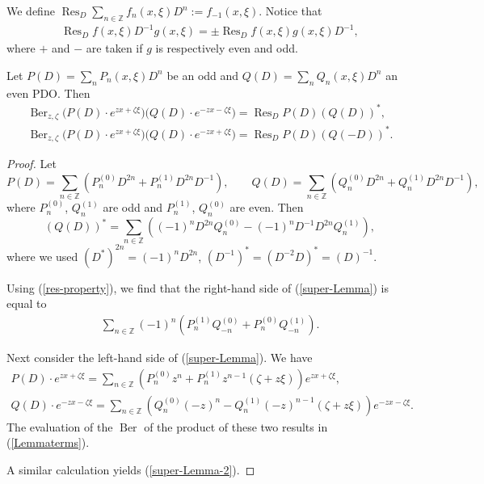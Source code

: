 \documentclass[pdftex]{sigma}
\numberwithin{equation}{section}
\newcommand{\Res}{\mathop\mathrm{Res}\nolimits}
\newcommand{\Ber}{\mathop\mathrm{Ber}\nolimits}
\newcommand{\Z}{\mathbb{Z}}
\begin{document}
We def\/ine $\Res_D\sum\limits_{n\in\Z}
f_n(x,\xi)D^n :=f_{-1}(x,\xi)$. Notice that
  \begin{gather}\label{res-property}
  \Res_D
f(x,\xi)D^{-1}g(x,\xi) =  \pm \Res_D
f(x,\xi)g(x,\xi)D^{-1} ,
 \end{gather}
 where $+$ and $-$ are taken if $g$ is
respectively even and odd.


 \begin{lemma} \label{SuperLemma} Let $P(D)=\sum_n P_n(x,\xi) D^n$ be an odd and
 $Q(D)=\sum_n Q_n(x,\xi) D^n$ an even PDO. Then
\begin{gather}\label{super-Lemma}
\Ber_{z,\zeta}  \big(P(D)\cdot e^{zx+\zeta\xi}\big)\big(Q(D)\cdot
e^{-zx-\zeta\xi}\big) = \Res_D P(D)\left(Q(D)\right)^* ,
\\
\label{super-Lemma-2}
\Ber_{z,\zeta}  \big(P(D)\cdot e^{zx+\zeta\xi}\big)\big(Q(D)\cdot
e^{-zx+\zeta\xi}\big) = \Res_D P(D)\left(Q(-D)\right)^* .
\end{gather}
 \end{lemma}

\begin{proof} Let
 \[
P(D)=\sum_{n\in\Z}\left(
P_n^{(0)}D^{2n}+P_n^{(1)}D^{2n}D^{-1}\right) ,\qquad
Q(D)=\sum_{n\in\Z}\left(
Q_n^{(0)}D^{2n}+Q_n^{(1)}D^{2n}D^{-1}\right) ,
 \]
where $P_n^{(0)}$, $Q_n^{(1)}$  are odd and $P_n^{(1)}$, $Q_n^{(0)}$ are
even. Then{\samepage
 \[
(Q(D))^* = \sum_{n\in\Z}\left(
(-1)^nD^{2n}Q_n^{(0)}-(-1)^nD^{-1}D^{2n}Q_n^{(1)}\right) ,
 \]
where we used
$
(D^*)^{2n}=(-1)^nD^{2n}$, $\left(
D^{-1}\right)^{*}=\left( D^{-2}D\right)^{*}=\left( D\right)^{-1}
$.  }

Using (\ref{res-property}), we f\/ind that the right-hand side
of (\ref{super-Lemma}) is equal to
  \begin{gather}\label{Lemmaterms}
\sum_{n\in\Z}(-1)^n\left(P_n^{(1)}Q_{-n}^{(0)}+
P_n^{(0)}Q_{-n}^{(1)} \right) .
  \end{gather}

 Next consider the left-hand side of (\ref{super-Lemma}). We have
\begin{gather*}
P(D)\cdot e^{zx+\zeta\xi} =\sum_{n\in\Z}\left(
P_n^{(0)}z^{n}+P_n^{(1)}z^{n-1}\left(\zeta+z\xi
\right)\right)e^{zx+\zeta\xi} ,
\\
Q(D)\cdot e^{-zx-\zeta\xi} =\sum_{n\in\Z}\left(
Q_n^{(0)}(-z)^{n}-Q_n^{(1)}(-z)^{n-1}\left(\zeta+z\xi
\right)\right)e^{-zx-\zeta\xi} .
\end{gather*}
   The evaluation of the $\Ber$ of the product of these
   two results in  (\ref{Lemmaterms}).

A similar calculation yields (\ref{super-Lemma-2}).
\end{proof}
\end{document}

